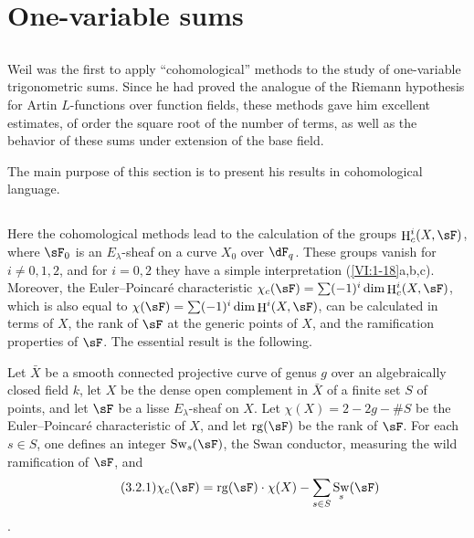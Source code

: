 \documentclass[12pt,oneside,english]{smfbook}
\DeclareMathOperator{\h}{H}
\DeclareMathOperator{\swan}{Sw}
\newcounter{char}
\begin{document}
\section{One-variable sums}\label{VI:3}

\subsection{}\label{VI:3-1}

Weil was the first to apply ``cohomological'' methods to the study of one-variable trigonometric sums. Since he had proved the analogue of the Riemann hypothesis for Artin $L$-functions over function fields, these methods gave him excellent estimates, of order the square root of the number of terms, as well as the behavior of these sums under extension of the base field.

The main purpose of this section is to present his results in cohomological language.

\subsection{}\label{VI:3-2}

Here the cohomological methods lead to the calculation of the groups $\h_c^i(X,\sF)$, where $\sF_0$ is an $E_\lambda$-sheaf on a curve $X_0$ over $\dF_q$. These groups vanish for $i\ne0,1,2$, and for $i=0,2$ they have a simple interpretation (\ref{VI:1-18}a,b,c). Moreover, the Euler--Poincaré characteristic $\chi_c(\sF)=\sum(-1)^i\dim\h_c^i(X,\sF)$, which is also equal to $\chi(\sF)=\sum(-1)^i\dim\h^i(X,\sF)$, can be calculated in terms of $X$, the rank of $\sF$ at the generic points of $X$, and the ramification properties of $\sF$. The essential result is the following.

Let $\bar X$ be a smooth connected projective curve of genus $g$ over an algebraically closed field $k$, let $X$ be the dense open complement in $\bar X$ of a finite set $S$ of points, and let $\sF$ be a lisse $E_\lambda$-sheaf on $X$. Let $\chi(X)=2-2g-\#S$ be the Euler--Poincaré characteristic of $X$, and let $\operatorname{rg}(\sF)$ be the rank of $\sF$. For each $s\in S$, one defines an integer $\swan_s(\sF)$, the Swan conductor, measuring the wild ramification of $\sF$, and
\begin{align*}\tag{3.2.1}\label{VI:eq:3-2-1}
  \chi_c(\sF) = \operatorname{rg}(\sF) \cdot \chi(X) - \sum_{s\in S} \swan_s(\sF)
\end{align*}
\cite{ra65}.
\end{document}
